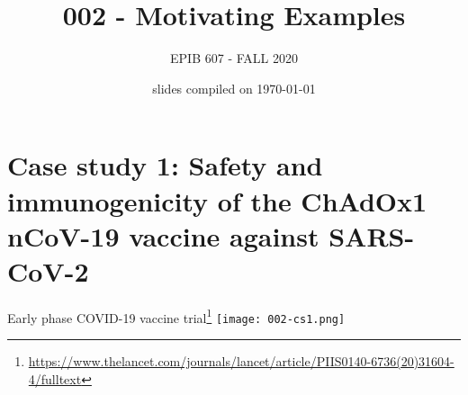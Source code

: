 \documentclass[10pt]{beamer}\usepackage[]{graphicx}\usepackage[]{color}
\begin{document}
	
	
	
	
	\title{002 - Motivating Examples}
	\author{EPIB 607 - FALL 2020}
	
	\date{slides compiled on \today}
	
	\maketitle

\section{Case study 1: Safety and immunogenicity of the ChAdOx1 nCoV-19	vaccine against SARS-CoV-2}


\begin{frame}{Early phase COVID-19 vaccine trial\footnote{\tiny\url{https://www.thelancet.com/journals/lancet/article/PIIS0140-6736(20)31604-4/fulltext}}}
	\centering
	\texttt{[image: 002-cs1.png]}	
\end{frame}
\end{document}
